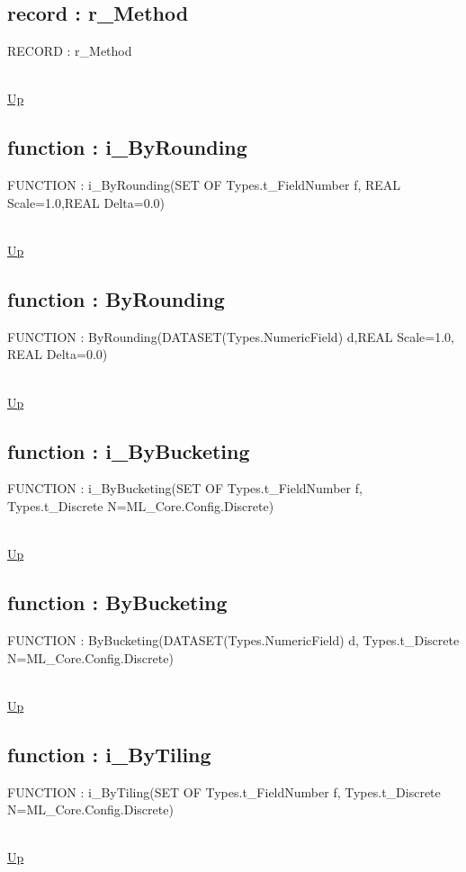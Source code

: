 \subsection*{record : r\_Method}
\hypertarget{ecldoc:ml_core.discretize.r_method}{RECORD : r\_Method} \\
\hyperlink{ecldoc:ML_Core.Discretize}{Up} \\
\par
\subsection*{function : i\_ByRounding}
\hypertarget{ecldoc:ml_core.discretize.i_byrounding}{FUNCTION : i\_ByRounding(SET OF Types.t\_FieldNumber f, REAL Scale=1.0,REAL Delta=0.0)} \\
\hyperlink{ecldoc:ML_Core.Discretize}{Up} \\
\par
\subsection*{function : ByRounding}
\hypertarget{ecldoc:ml_core.discretize.byrounding}{FUNCTION : ByRounding(DATASET(Types.NumericField) d,REAL Scale=1.0, REAL Delta=0.0)} \\
\hyperlink{ecldoc:ML_Core.Discretize}{Up} \\
\par
\subsection*{function : i\_ByBucketing}
\hypertarget{ecldoc:ml_core.discretize.i_bybucketing}{FUNCTION : i\_ByBucketing(SET OF Types.t\_FieldNumber f, Types.t\_Discrete N=ML\_Core.Config.Discrete)} \\
\hyperlink{ecldoc:ML_Core.Discretize}{Up} \\
\par
\subsection*{function : ByBucketing}
\hypertarget{ecldoc:ml_core.discretize.bybucketing}{FUNCTION : ByBucketing(DATASET(Types.NumericField) d, Types.t\_Discrete N=ML\_Core.Config.Discrete)} \\
\hyperlink{ecldoc:ML_Core.Discretize}{Up} \\
\par
\subsection*{function : i\_ByTiling}
\hypertarget{ecldoc:ml_core.discretize.i_bytiling}{FUNCTION : i\_ByTiling(SET OF Types.t\_FieldNumber f, Types.t\_Discrete N=ML\_Core.Config.Discrete)} \\
\hyperlink{ecldoc:ML_Core.Discretize}{Up} \\
\par

